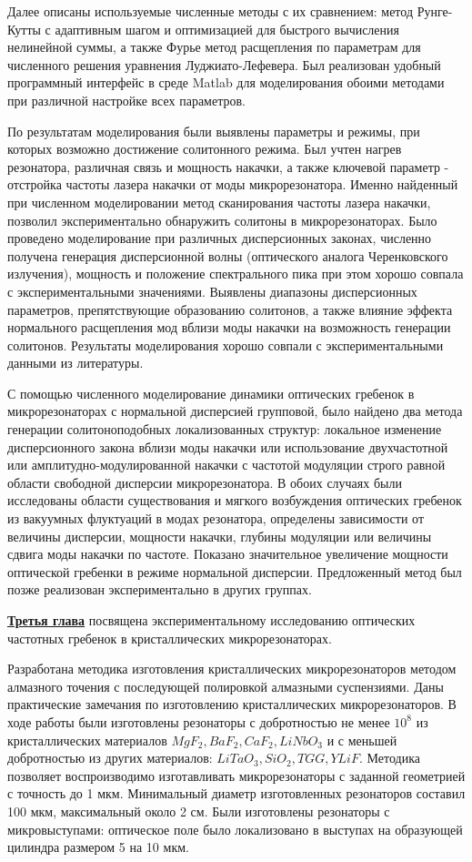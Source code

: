 Далее описаны используемые численные методы с их сравнением: метод Рунге-Кутты с адаптивным шагом и оптимизацией для быстрого вычисления нелинейной суммы, а также Фурье метод расщепления по параметрам для численного решения уравнения Луджиато-Лефевера. Был реализован удобный программный интерфейс в среде Matlab для моделирования обоими методами при различной настройке всех параметров.

По результатам моделирования были выявлены параметры и режимы, при которых возможно достижение солитонного режима. Был учтен нагрев резонатора, различная связь и мощность накачки, а также ключевой параметр - отстройка частоты лазера накачки от моды микрорезонатора. Именно найденный при численном моделировании метод сканирования частоты лазера накачки, позволил экспериментально обнаружить солитоны в микрорезонаторах. Было проведено моделирование при различных дисперсионных законах, численно получена генерация дисперсионной волны (оптического аналога Черенковского излучения), мощность и положение спектрального пика при этом хорошо совпала с экспериментальными значениями. Выявлены диапазоны дисперсионных параметров, препятствующие образованию солитонов, а также влияние эффекта нормального расщепления мод вблизи моды накачки на возможность генерации солитонов. Результаты моделирования хорошо совпали с экспериментальными данными из литературы.

С помощью численного моделирование динамики оптических гребенок в микрорезонаторах с нормальной дисперсией групповой, было найдено два метода генерации солитоноподобных локализованных структур: локальное изменение дисперсионного закона вблизи моды накачки или использование двухчастотной или амплитудно-модулированной накачки с частотой модуляции строго равной области свободной дисперсии микрорезонатора. В обоих случаях были исследованы области существования и мягкого возбуждения оптических гребенок из вакуумных флуктуаций в модах резонатора, определены зависимости от величины дисперсии, мощности накачки, глубины модуляции или величины сдвига моды накачки по частоте. Показано значительное увеличение мощности оптической гребенки в режиме нормальной дисперсии. Предложенный метод был позже реализован экспериментально в других группах.

\underline{\textbf{Третья глава}} посвящена экспериментальному исследованию оптических частотных гребенок в кристаллических микрорезонаторах.

Разработана методика изготовления кристаллических микрорезонаторов методом алмазного точения с последующей полировкой алмазными суспензиями. Даны практические замечания по изготовлению кристаллических микрорезонаторов. В ходе работы были изготовлены резонаторы с добротностью не менее $10^8$ из кристаллических материалов $MgF_2,BaF_2,CaF_2,LiNbO_3$ и с меньшей добротностью из других материалов: $LiTaO_3,SiO_2,TGG,YLiF$. Методика позволяет воспроизводимо изготавливать микрорезонаторы с заданной геометрией с точность до 1 мкм. Минимальный диаметр изготовленных резонаторов составил 100 мкм, максимальный около 2 см. Были изготовлены резонаторы с микровыступами: оптическое поле было локализовано в выступах на образующей цилиндра размером 5 на 10 мкм.

